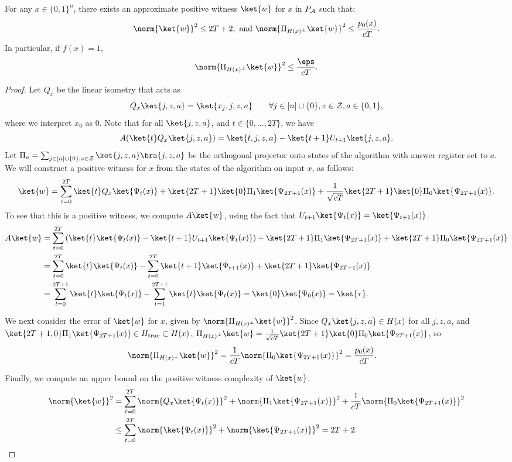 \documentclass{toc}
\begin{document}
\begin{lemma}\label{lem:alg-to-span-pos}
For any $x\in\{0,1\}^n$, there exists an approximate positive witness $\ket{w}$ for $x$ in $P_{\cal A}$ such that:
$$\norm{\ket{w}}^2 \leq 2T+2,
\mbox{ and }
\norm{\Pi_{H(x)^\bot}\ket{w}}^2\leq \frac{p_0(x)}{cT}.$$ 
In particular, if $f(x)=1$, 
$$\norm{\Pi_{H(x)^\bot}\ket{w}}^2\leq \frac{\eps}{cT}.$$ 
\end{lemma}
\begin{proof}
Let $Q_x$ be the linear isometry that acts as 
$$Q_x\ket{j,z,a}=\ket{x_j,j,z,a}\qquad \forall j\in [n]\cup\{0\}, z\in{\cal Z},a\in\{0,1\},$$
where we interpret $x_0$ as 0. Note that for all $\ket{j,z,a}$, and $t\in \{0,\dots,2T\}$, we have 
$$A(\ket{t}Q_x\ket{j,z,a}) = \ket{t,j,z,a}-\ket{t+1}U_{t+1}\ket{j,z,a}.$$
Let $\Pi_a=\sum_{j\in [n]\cup\{0\},z\in{\cal Z}}\ket{j,z,a}\bra{j,z,a}$ be the orthogonal projector onto states of the algorithm with answer register set to $a$.
We will construct a positive witness for $x$ from the states of the algorithm on input $x$, as follows:
$$\ket{w}=\sum_{t=0}^{2T}\ket{t}Q_x\ket{\Psi_t(x)}+\ket{2T+1}\ket{0}\Pi_1\ket{\Psi_{2T+1}(x)}+\frac{1}{\sqrt{cT}}\ket{2T+1}\ket{0}\Pi_0\ket{\Psi_{2T+1}(x)}.$$
To see that this is a positive witness, we compute $A\ket{w}$, using the fact that $U_{t+1}\ket{\Psi_t(x)}=\ket{\Psi_{t+1}(x)}$. %
%
\begin{align*}
A\ket{w} &= \sum_{t=0}^{2T}\left(\ket{t}\ket{\Psi_t(x)} - \ket{t+1}U_{t+1}\ket{\Psi_t(x)}\right)+\ket{2T+1}\Pi_1\ket{\Psi_{2T+1}(x)}+\ket{2T+1}\Pi_0\ket{\Psi_{2T+1}(x)}\\
&= \sum_{t=0}^{2T}\ket{t}\ket{\Psi_t(x)} - \sum_{t=0}^{2T}\ket{t+1}\ket{\Psi_{t+1}(x)}+\ket{2T+1}\ket{\Psi_{2T+1}(x)}\\
&= \sum_{t=0}^{2T+1}\ket{t}\ket{\Psi_t(x)} - \sum_{t=1}^{2T+1}\ket{t}\ket{\Psi_t(x)} = \ket{0}\ket{\Psi_0(x)} = \ket{\tau}.
\end{align*}

We next consider the error of $\ket{w}$ for $x$, given by $\norm{\Pi_{H(x)^\bot}\ket{w}}^2$. Since $Q_x\ket{j,z,a}\in H(x)$ for all $j,z,a$, and $\ket{2T+1,0}\Pi_1\ket{\Psi_{2T+1}(x)}\in H_{\mathrm{true}}\subset H(x)$,
$\Pi_{H(x)^\bot}\ket{w} = \frac{1}{\sqrt{cT}}\ket{2T+1}\ket{0}\Pi_0\ket{\Psi_{2T+1}(x)}$, so
\begin{align*}
\norm{\Pi_{H(x)^\bot}\ket{w}}^2 &= \frac{1}{cT}\norm{\Pi_0\ket{\Psi_{2T+1}(x)}}^2 = \frac{p_0(x)}{cT}.
\end{align*}

Finally, we compute %
an upper bound on the   %
positive witness complexity
of $\ket{w}$. %
\begin{align*}
\norm{\ket{w}}^2 &= \sum_{t=0}^{2T}\norm{Q_x\ket{\Psi_t(x)}}^2 + \norm{\Pi_1\ket{\Psi_{2T+1}(x)}}^2 + \frac{1}{cT}\norm{\Pi_0\ket{\Psi_{2T+1}(x)}}^2\\
&\leq \sum_{t=0}^{2T}\norm{\ket{\Psi_{t}(x)}}^2 + \norm{\ket{\Psi_{2T+1}(x)}}^2 = 2T+2.\qedhere
\end{align*}
\end{proof}
\end{document}
